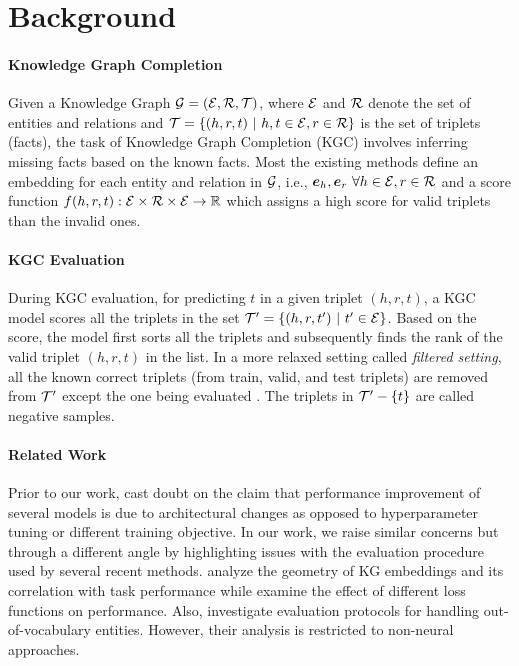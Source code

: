 \documentclass[11pt,a4paper]{article}
\begin{document}
%
 \section{Background}

\paragraph{Knowledge Graph Completion} Given a Knowledge Graph $\mathcal{G} = (\mathcal{E}, \mathcal{R},\mathcal{T})$, where $\mathcal{E}$ and $\mathcal{R}$ denote the set of entities and relations and $\mathcal{T} = \{(h,r,t) \ | \ h,t \in \mathcal{E}, r \in \mathcal{R} \}$ is the set of triplets (facts), the task of Knowledge Graph Completion (KGC) involves inferring missing facts based on the known facts. Most the existing methods define an embedding for each entity and relation in $\mathcal{G}$, i.e., $\bm{e}_h, \bm{e}_r \ \forall h \in \mathcal{E}, r \in \mathcal{R}$ and a score function $f(h,r,t): \mathcal{E} \times \mathcal{R} \times \mathcal{E} \rightarrow \mathbb{R}{}$ which assigns a high score for valid triplets than the invalid ones.


\paragraph{KGC Evaluation} During KGC evaluation, for predicting $t$ in a given triplet $(h,r,t)$, a KGC model scores all the triplets in the set $\mathcal{T}' = \{(h,r,t') \ | \ t' \in \mathcal{E}\}$. Based on the score, the model first sorts all the triplets and subsequently finds the rank of the valid triplet $(h,r,t)$ in the list. In a more relaxed setting called \textit{filtered setting}, all the known correct triplets (from train, valid, and test triplets) are removed from $\mathcal{T}'$ except the one being evaluated \cite{transe}.
The triplets in $\mathcal{T}'  - \{t\}$ are called negative samples.


\paragraph{Related Work}
\label{sec:related_works}

Prior to our work, \citet{baselines_strike_back,mausam_2} cast doubt on the claim that performance improvement of several models is due to architectural changes as opposed to hyperparameter tuning or different training objective. 
In our work, we raise similar concerns but through a different angle by highlighting issues with the evaluation procedure used by several recent methods. \citet{kg_geometry} analyze the geometry of KG embeddings and its correlation with task performance while \citet{effect_of_loss_function} examine the effect of different loss functions on performance. Also, \citet{mausam_1} investigate evaluation protocols for handling out-of-vocabulary entities. However, their analysis is restricted to non-neural approaches.
\end{document}

